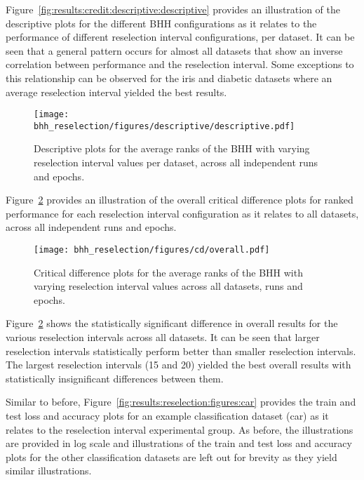 Figure~\ref{fig:results:credit:descriptive:descriptive} provides an illustration of the descriptive plots for the different \acs{BHH} configurations as it relates to the performance of different reselection interval configurations, per dataset. It can be seen that a general pattern occurs for almost all datasets that show an inverse correlation between performance and the reselection interval. Some exceptions to this relationship can be observed for the iris and diabetic datasets where an average reselection interval yielded the best results.

\begin{figure}[htb]
      \centering
      \texttt{[image: bhh\_reselection/figures/descriptive/descriptive.pdf]}
      \caption{Descriptive plots for the average ranks of the \acs{BHH} with varying reselection interval values per dataset, across all independent runs and epochs.}
      \label{fig:results:reselection:descriptive:descriptive}
\end{figure}

Figure~\ref{fig:results:reselection:descriptive:cd} provides an illustration of the overall critical difference plots for ranked performance for each reselection interval configuration as it relates to all datasets, across all independent runs and epochs.

\begin{figure}[htb]
      \centering
      \texttt{[image: bhh\_reselection/figures/cd/overall.pdf]}
      \caption{Critical difference plots for the average ranks of the \acs{BHH} with varying reselection interval values across all datasets, runs and epochs.}
      \label{fig:results:reselection:descriptive:cd}
\end{figure}

Figure~\ref{fig:results:reselection:descriptive:cd} shows the statistically significant difference in overall results for the various reselection intervals across all datasets. It can be seen that larger reselection intervals statistically perform better than smaller reselection intervals. The largest reselection intervals (15 and 20) yielded the best overall results with statistically insignificant differences between them.

Similar to before, Figure~\ref{fig:results:reselection:figures:car} provides the train and test loss and accuracy plots for an example classification dataset (car) as it relates to the reselection interval experimental group. As before, the illustrations are provided in log scale and illustrations of the train and test loss and accuracy plots for the other classification datasets are left out for brevity as they yield similar illustrations.

